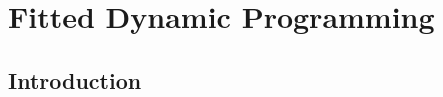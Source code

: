 \documentclass[\main/main]{subfiles}
\begin{document}
\chapter{Fitted Dynamic Programming}
\label{ch:fitted_dp}

\tableofcontents

\newpage
\section{Introduction}
\end{document}
